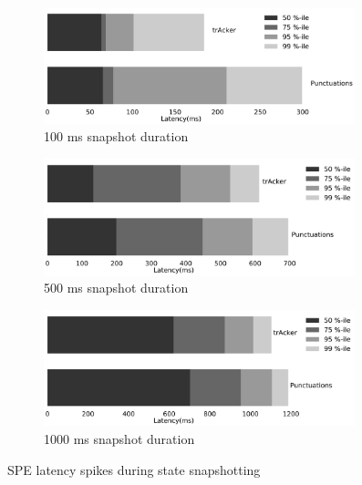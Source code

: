 \begin{figure}[t!]
    \begin{subfigure}[b]{0.3\textwidth}
            \includegraphics[width=0.99\textwidth]{Chapters/Tracker/pics/buffering_latencies_barh_100}
            \caption{100 ms snapshot duration}
            \label{100ms_snapshot}
    \end{subfigure}
    \hspace{5mm}
    \begin{subfigure}[b]{0.3\textwidth}
            \includegraphics[width=0.99\textwidth]{Chapters/Tracker/pics/buffering_latencies_barh_500}
            \caption{500 ms snapshot duration}
            \label{500ms_snapshot}
    \end{subfigure}
    \hspace{5mm}
    \begin{subfigure}[b]{0.3\textwidth}
            \includegraphics[width=0.99\textwidth]{Chapters/Tracker/pics/buffering_latencies_barh_1000}
            \caption{1000 ms snapshot duration}
            \label{1000ms_snapshot}
    \end{subfigure}
    \caption{SPE latency spikes during state snapshotting}
    \label{snapshot_spikes}
\end{figure}

